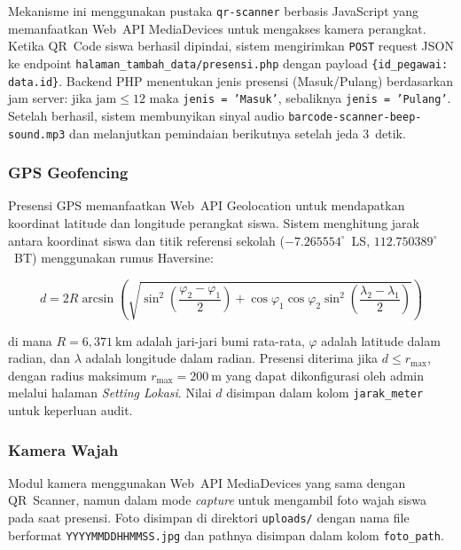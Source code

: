 \documentclass[12pt,a4paper]{article}
\begin{document}
Mekanisme ini menggunakan pustaka \texttt{qr-scanner} berbasis
JavaScript yang memanfaatkan Web~API MediaDevices untuk mengakses
kamera perangkat.
Ketika QR~Code siswa berhasil dipindai, sistem mengirimkan
\texttt{POST} request JSON ke endpoint
\texttt{halaman\_tambah\_data/presensi.php} dengan payload
\texttt{\{id\_pegawai: data.id\}}.
Backend PHP menentukan jenis presensi (Masuk/Pulang) berdasarkan jam
server: jika $\text{jam} \leq 12$ maka \texttt{jenis = 'Masuk'},
sebaliknya \texttt{jenis = 'Pulang'}.
Setelah berhasil, sistem membunyikan sinyal audio
\texttt{barcode-scanner-beep-sound.mp3} dan melanjutkan pemindaian
berikutnya setelah jeda 3~detik.

\subsubsection{GPS Geofencing}

Presensi GPS memanfaatkan Web~API Geolocation untuk mendapatkan
koordinat latitude dan longitude perangkat siswa.
Sistem menghitung jarak antara koordinat siswa dan titik referensi
sekolah ($-7.265554^\circ$~LS, $112.750389^\circ$~BT) menggunakan
rumus Haversine:

\begin{equation}
\label{eq:haversine}
d = 2R \arcsin\!\left(\sqrt{
  \sin^2\!\left(\frac{\varphi_2 - \varphi_1}{2}\right) +
  \cos\varphi_1 \cos\varphi_2
  \sin^2\!\left(\frac{\lambda_2 - \lambda_1}{2}\right)
}\right)
\end{equation}

\noindent di mana $R = 6{,}371~\text{km}$ adalah jari-jari bumi rata-rata,
$\varphi$ adalah latitude dalam radian, dan $\lambda$ adalah longitude
dalam radian. Presensi diterima jika $d \leq r_{\max}$, dengan radius
maksimum $r_{\max} = 200~\text{m}$ yang dapat dikonfigurasi oleh
admin melalui halaman \textit{Setting Lokasi}.
Nilai $d$ disimpan dalam kolom \texttt{jarak\_meter} untuk keperluan
audit.

\subsubsection{Kamera Wajah}

Modul kamera menggunakan Web~API MediaDevices yang sama dengan QR~Scanner,
namun dalam mode \textit{capture} untuk mengambil foto wajah siswa
pada saat presensi.
Foto disimpan di direktori \texttt{uploads/} dengan nama file berformat
\texttt{YYYYMMDDHHMMSS.jpg} dan pathnya disimpan dalam kolom
\texttt{foto\_path}.
\end{document}
